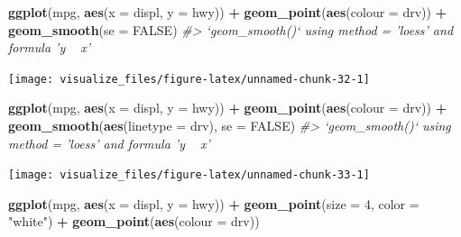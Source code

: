 \documentclass[]{book}
\newenvironment{Shaded}{\begin{snugshade}}{\end{snugshade}}
\newcommand{\CommentTok}[1]{\textcolor[rgb]{0.56,0.35,0.01}{\textit{#1}}}
\newcommand{\DataTypeTok}[1]{\textcolor[rgb]{0.13,0.29,0.53}{#1}}
\newcommand{\DecValTok}[1]{\textcolor[rgb]{0.00,0.00,0.81}{#1}}
\newcommand{\KeywordTok}[1]{\textcolor[rgb]{0.13,0.29,0.53}{\textbf{#1}}}
\newcommand{\NormalTok}[1]{#1}
\newcommand{\OperatorTok}[1]{\textcolor[rgb]{0.81,0.36,0.00}{\textbf{#1}}}
\newcommand{\OtherTok}[1]{\textcolor[rgb]{0.56,0.35,0.01}{#1}}
\newcommand{\StringTok}[1]{\textcolor[rgb]{0.31,0.60,0.02}{#1}}
\theoremstyle{plain}
\theoremstyle{remark}
\begin{document}
\begin{Shaded}
\begin{Highlighting}[]
\KeywordTok{ggplot}\NormalTok{(mpg, }\KeywordTok{aes}\NormalTok{(}\DataTypeTok{x =}\NormalTok{ displ, }\DataTypeTok{y =}\NormalTok{ hwy)) }\OperatorTok{+}
\StringTok{  }\KeywordTok{geom_point}\NormalTok{(}\KeywordTok{aes}\NormalTok{(}\DataTypeTok{colour =}\NormalTok{ drv)) }\OperatorTok{+}
\StringTok{  }\KeywordTok{geom_smooth}\NormalTok{(}\DataTypeTok{se =} \OtherTok{FALSE}\NormalTok{)}
\CommentTok{#> `geom_smooth()` using method = 'loess' and formula 'y ~ x'}
\end{Highlighting}
\end{Shaded}

\begin{center}\texttt{[image: visualize\_files/figure-latex/unnamed-chunk-32-1]} \end{center}

\begin{Shaded}
\begin{Highlighting}[]
\KeywordTok{ggplot}\NormalTok{(mpg, }\KeywordTok{aes}\NormalTok{(}\DataTypeTok{x =}\NormalTok{ displ, }\DataTypeTok{y =}\NormalTok{ hwy)) }\OperatorTok{+}
\StringTok{  }\KeywordTok{geom_point}\NormalTok{(}\KeywordTok{aes}\NormalTok{(}\DataTypeTok{colour =}\NormalTok{ drv)) }\OperatorTok{+}
\StringTok{  }\KeywordTok{geom_smooth}\NormalTok{(}\KeywordTok{aes}\NormalTok{(}\DataTypeTok{linetype =}\NormalTok{ drv), }\DataTypeTok{se =} \OtherTok{FALSE}\NormalTok{)}
\CommentTok{#> `geom_smooth()` using method = 'loess' and formula 'y ~ x'}
\end{Highlighting}
\end{Shaded}

\begin{center}\texttt{[image: visualize\_files/figure-latex/unnamed-chunk-33-1]} \end{center}

\begin{Shaded}
\begin{Highlighting}[]
\KeywordTok{ggplot}\NormalTok{(mpg, }\KeywordTok{aes}\NormalTok{(}\DataTypeTok{x =}\NormalTok{ displ, }\DataTypeTok{y =}\NormalTok{ hwy)) }\OperatorTok{+}
\StringTok{   }\KeywordTok{geom_point}\NormalTok{(}\DataTypeTok{size =} \DecValTok{4}\NormalTok{, }\DataTypeTok{color =} \StringTok{"white"}\NormalTok{) }\OperatorTok{+}
\StringTok{   }\KeywordTok{geom_point}\NormalTok{(}\KeywordTok{aes}\NormalTok{(}\DataTypeTok{colour =}\NormalTok{ drv))}
\end{Highlighting}
\end{Shaded}
\end{document}
